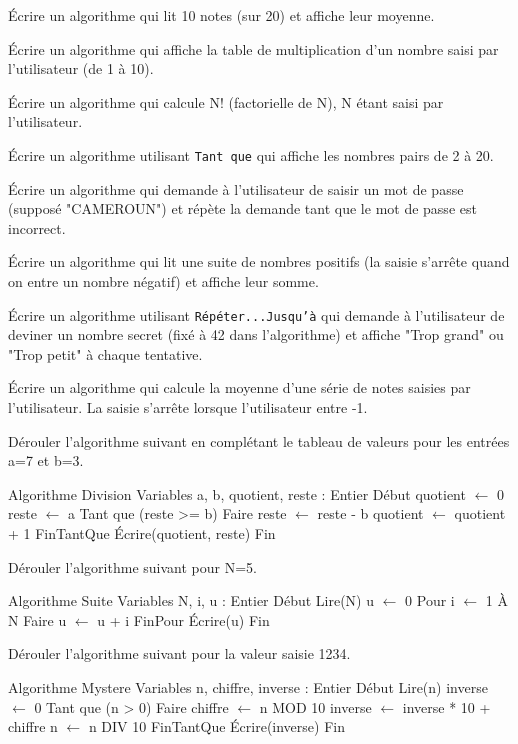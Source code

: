 \exo{}
Écrire un algorithme qui lit 10 notes (sur 20) et affiche leur moyenne.

\exo{}
Écrire un algorithme qui affiche la table de multiplication d'un nombre saisi par l'utilisateur (de 1 à 10).

\exo{}
Écrire un algorithme qui calcule N! (factorielle de N), N étant saisi par l'utilisateur.


\exo{}
Écrire un algorithme utilisant \texttt{Tant que} qui affiche les nombres pairs de 2 à 20.

\exo{}
Écrire un algorithme qui demande à l'utilisateur de saisir un mot de passe (supposé "CAMEROUN") et répète la demande tant que le mot de passe est incorrect.

\exo{}
Écrire un algorithme qui lit une suite de nombres positifs (la saisie s'arrête quand on entre un nombre négatif) et affiche leur somme.

\exo{}
Écrire un algorithme utilisant \texttt{Répéter...Jusqu'à} qui demande à l'utilisateur de deviner un nombre secret (fixé à 42 dans l'algorithme) et affiche "Trop grand" ou "Trop petit" à chaque tentative.

\exo{}
Écrire un algorithme qui calcule la moyenne d'une série de notes saisies par l'utilisateur. La saisie s'arrête lorsque l'utilisateur entre -1.


\exo{}
Dérouler l'algorithme suivant en complétant le tableau de valeurs pour les entrées a=7 et b=3.
\begin{algo}
Algorithme Division
Variables
    a, b, quotient, reste : Entier
Début
    quotient $\leftarrow$ 0
    reste $\leftarrow$ a
    Tant que (reste >= b) Faire
        reste $\leftarrow$ reste - b
        quotient $\leftarrow$ quotient + 1
    FinTantQue
    Écrire(quotient, reste)
Fin
\end{algo}

\exo{}
Dérouler l'algorithme suivant pour N=5.
\begin{algo}
Algorithme Suite
Variables
    N, i, u : Entier
Début
    Lire(N)
    u $\leftarrow$ 0
    Pour i $\leftarrow$ 1 À N Faire
        u $\leftarrow$ u + i
    FinPour
    Écrire(u)
Fin
\end{algo}

\exo{}
Dérouler l'algorithme suivant pour la valeur saisie 1234.
\begin{algo}
Algorithme Mystere
Variables
    n, chiffre, inverse : Entier
Début
    Lire(n)
    inverse $\leftarrow$ 0
    Tant que (n > 0) Faire
        chiffre $\leftarrow$ n MOD 10
        inverse $\leftarrow$ inverse * 10 + chiffre
        n $\leftarrow$ n DIV 10
    FinTantQue
    Écrire(inverse)
Fin
\end{algo}

